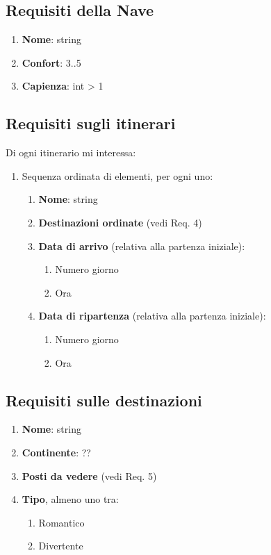 \documentclass[a4paper]{scrartcl}
\begin{document}
\begin{multicols}{2}
\subsection{Requisiti della Nave}
\begin{enumerate}
    \item \textbf{Nome}: string
    \item \textbf{Confort}: 3..5
    \item \textbf{Capienza}: int > 1
\end{enumerate}

\subsection{Requisiti sugli itinerari}
Di ogni itinerario mi interessa:
\begin{enumerate}
    \item Sequenza ordinata di elementi, per ogni uno:
    \begin{enumerate}
        \item \textbf{Nome}: string
        \item \textbf{Destinazioni ordinate} (vedi Req. 4)
        \item \textbf{Data di arrivo} (relativa alla partenza iniziale):
        \begin{enumerate}
            \item Numero giorno
            \item Ora
        \end{enumerate}
        \item \textbf{Data di ripartenza} (relativa alla partenza iniziale):
        \begin{enumerate}
            \item Numero giorno
            \item Ora
        \end{enumerate}
    \end{enumerate}
\end{enumerate}

\subsection{Requisiti sulle destinazioni}
\begin{enumerate}
    \item \textbf{Nome}: string
    \item \textbf{Continente}: ??
    \item \textbf{Posti da vedere} (vedi Req. 5)
    \item \textbf{Tipo}, almeno uno tra:
    \begin{enumerate}
        \item Romantico
        \item Divertente
    \end{enumerate}
\end{enumerate}


\end{multicols}
\end{document}
